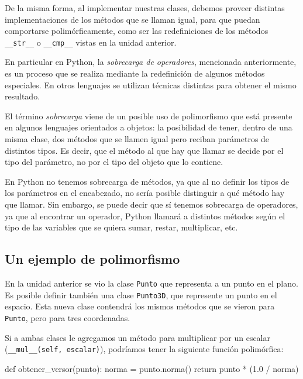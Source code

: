 De la misma forma, al implementar nuestras clases, debemos proveer
distintas implementaciones de los métodos que se llaman igual, para que
puedan comportarse polimórficamente, como ser las redefiniciones de los
métodos \lstinline!__str__! o \lstinline!__cmp__! vistas en la unidad
anterior.

En particular en Python, la {\it sobrecarga de operadores}, mencionada
anteriormente,  es un proceso que se realiza mediante la redefinición de
algunos métodos especiales.  En otros lenguajes se utilizan técnicas distintas
para obtener el mismo resultado.

\begin{sabias_que}
El término {\it sobrecarga} viene de un posible uso de polimorfismo que
está presente en algunos lenguajes orientados a objetos: la posibilidad de
tener, dentro de una misma clase, dos métodos que se llamen igual pero
reciban parámetros de distintos tipos.  Es decir, que el método al que hay
que llamar se decide por el tipo del parámetro, no por el tipo del objeto
que lo contiene.

En Python no tenemos sobrecarga de métodos, ya que al no definir los tipos
de los parámetros en el encabezado, no sería posible distinguir a qué
método hay que llamar.  Sin embargo, se puede decir que sí tenemos
sobrecarga de operadores, ya que al encontrar un operador, Python llamará a
distintos métodos según el tipo de las variables que se quiera sumar,
restar, multiplicar, etc.
\end{sabias_que}

\subsection{Un ejemplo de polimorfismo}

En la unidad anterior se vio la clase \lstinline!Punto! que representa a un
punto en el plano.  Es posible definir también una clase
\lstinline!Punto3D!, que represente un punto en el espacio.  Esta nueva
clase contendrá los mismos métodos que se vieron para \lstinline!Punto!,
pero para tres coordenadas.  

Si a ambas clases le agregamos un método para multiplicar por un escalar
(\lstinline!__mul__(self, escalar)!), podríamos tener la siguiente función
polimórfica:

\begin{codigo-python-sn}
def obtener_versor(punto):
    norma = punto.norma()
    return punto * (1.0 / norma)
\end{codigo-python-sn}

